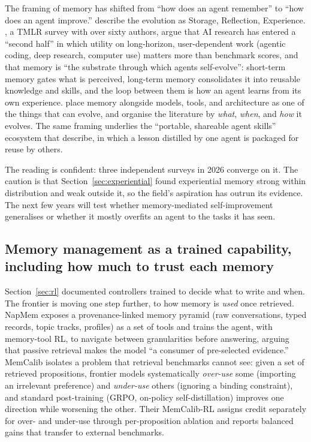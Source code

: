 \documentclass[11pt]{article}
\begin{document}
The framing of memory has shifted from ``how does an agent remember'' to ``how does an agent improve.'' \citet{luo2026storage} describe the evolution as Storage, Reflection, Experience. \citet{huang2026secondhalf}, a TMLR survey with over sixty authors, argue that AI research has entered a ``second half'' in which utility on long-horizon, user-dependent work (agentic coding, deep research, computer use) matters more than benchmark scores, and that memory is ``the substrate through which agents self-evolve'': short-term memory gates what is perceived, long-term memory consolidates it into reusable knowledge and skills, and the loop between them is how an agent learns from its own experience. \citet{gao2026selfevolving} place memory alongside models, tools, and architecture as one of the things that can evolve, and organise the literature by \emph{what}, \emph{when}, and \emph{how} it evolves. The same framing underlies the ``portable, shareable agent skills'' ecosystem that \citet{huang2026secondhalf} describe, in which a lesson distilled by one agent is packaged for reuse by others.

The reading is confident: three independent surveys in 2026 converge on it. The caution is that Section~\ref{sec:experiential} found experiential memory strong within distribution and weak outside it, so the field's aspiration has outrun its evidence. The next few years will test whether memory-mediated self-improvement generalises or whether it mostly overfits an agent to the tasks it has seen.

\subsection{Memory management as a trained capability, including how much to trust each memory}

Section~\ref{sec:rl} documented controllers trained to decide what to write and when. The frontier is moving one step further, to how memory is \emph{used} once retrieved. NapMem \citep{xu2026napmem} exposes a provenance-linked memory pyramid (raw conversations, typed records, topic tracks, profiles) as a set of tools and trains the agent, with memory-tool RL, to navigate between granularities before answering, arguing that passive retrieval makes the model ``a consumer of pre-selected evidence.'' MemCalib \citep{cao2026memcalib} isolates a problem that retrieval benchmarks cannot see: given a set of retrieved propositions, frontier models systematically \emph{over-use} some (importing an irrelevant preference) and \emph{under-use} others (ignoring a binding constraint), and standard post-training (GRPO, on-policy self-distillation) improves one direction while worsening the other. Their MemCalib-RL assigns credit separately for over- and under-use through per-proposition ablation and reports balanced gains that transfer to external benchmarks.
\end{document}
